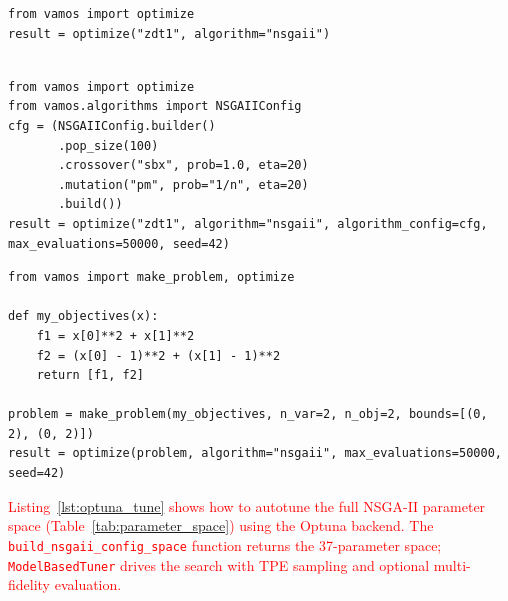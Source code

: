 \documentclass[journal]{IEEEtran}
\newcommand{\VAMOS}{VAMOS}
\begin{document}
\begin{lstlisting}[float=*,caption={Minimal NSGA-II run on ZDT1 in \VAMOS{}.},label={lst:quickstart}]
from vamos import optimize
result = optimize("zdt1", algorithm="nsgaii")
                 
\end{lstlisting}

\begin{lstlisting}[float=*,caption={Builder API for fine-grained configuration.},label={lst:builder}]
from vamos import optimize
from vamos.algorithms import NSGAIIConfig
cfg = (NSGAIIConfig.builder()
       .pop_size(100)
       .crossover("sbx", prob=1.0, eta=20)
       .mutation("pm", prob="1/n", eta=20)
       .build())
result = optimize("zdt1", algorithm="nsgaii", algorithm_config=cfg, max_evaluations=50000, seed=42)
\end{lstlisting}

\begin{lstlisting}[float=*,caption={Defining and optimizing a custom problem.},label={lst:make_problem}]
from vamos import make_problem, optimize

def my_objectives(x):
    f1 = x[0]**2 + x[1]**2
    f2 = (x[0] - 1)**2 + (x[1] - 1)**2
    return [f1, f2]

problem = make_problem(my_objectives, n_var=2, n_obj=2, bounds=[(0, 2), (0, 2)])
result = optimize(problem, algorithm="nsgaii", max_evaluations=50000, seed=42)
\end{lstlisting}

\textcolor{red}{Listing~\ref{lst:optuna_tune} shows how to autotune the full NSGA-II parameter space (Table~\ref{tab:parameter_space}) using the Optuna backend. The \texttt{build\_nsgaii\_config\_space} function returns the 37-parameter space; \texttt{ModelBasedTuner} drives the search with TPE sampling and optional multi-fidelity evaluation.}
\end{document}
